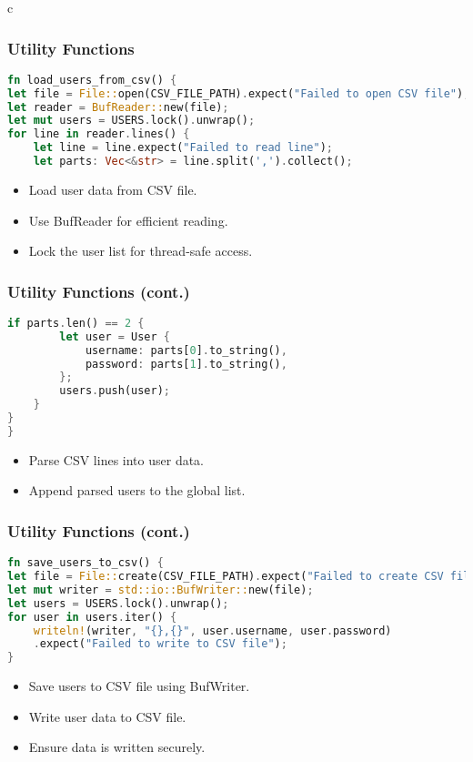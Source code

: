 \documentclass[aspectratio=169, table]{beamer}
\begin{document}
c
\begin{frame}[fragile]
\frametitle{Utility Functions}
\begin{lstlisting}[language=Rust]
fn load_users_from_csv() {
let file = File::open(CSV_FILE_PATH).expect("Failed to open CSV file");
let reader = BufReader::new(file);
let mut users = USERS.lock().unwrap();
for line in reader.lines() {
	let line = line.expect("Failed to read line");
	let parts: Vec<&str> = line.split(',').collect();
\end{lstlisting}
\begin{itemize}
	\item Load user data from CSV file.
	\item Use BufReader for efficient reading.
	\item Lock the user list for thread-safe access.
\end{itemize}
\end{frame}

\begin{frame}[fragile]
\frametitle{Utility Functions (cont.)}
\begin{lstlisting}[language=Rust]
	if parts.len() == 2 {
		let user = User {
			username: parts[0].to_string(),
			password: parts[1].to_string(),
		};
		users.push(user);
	}
}
}


\end{lstlisting}
\begin{itemize}
\item Parse CSV lines into user data.
\item Append parsed users to the global list.

\end{itemize}
\end{frame}

\begin{frame}[fragile]
\frametitle{Utility Functions (cont.)}
\begin{lstlisting}[language=Rust]
fn save_users_to_csv() {
let file = File::create(CSV_FILE_PATH).expect("Failed to create CSV file");
let mut writer = std::io::BufWriter::new(file);
let users = USERS.lock().unwrap();
for user in users.iter() {
	writeln!(writer, "{},{}", user.username, user.password)
	.expect("Failed to write to CSV file");
}
\end{lstlisting}
\begin{itemize}
\item Save users to CSV file using BufWriter.
\item Write user data to CSV file.
\item Ensure data is written securely.
\end{itemize}
\end{frame}
\end{document}
